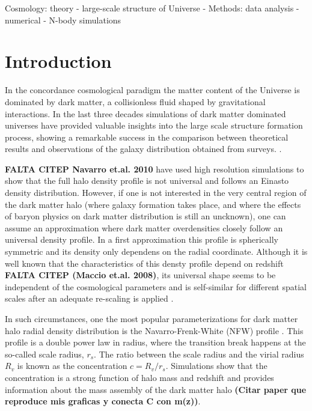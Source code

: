 \documentclass[a4,useAMS,usenatbib,usegraphicx]{mn2e}
\begin{document}
\begin{keywords}
Cosmology: theory - large-scale structure of Universe -
Methods: data analysis - numerical - N-body simulations
\end{keywords}


\section{Introduction}
\label{sec:introduction}
In the concordance cosmological paradigm the matter content of the
Universe is dominated by dark matter, a collisionless fluid shaped by
gravitational interactions.  In the last three decades simulations of
dark matter dominated universes have provided valuable insights into
the large scale structure formation process, showing a remarkable
success in the comparison between theoretical results and observations
of the galaxy distribution obtained from surveys.
\citep{Springel2005,2011ApJ...740..102K}.

{\bf FALTA CITEP Navarro et.al. 2010} have used high resolution simulations to show
that the full halo density profile is not universal and follows an
Einasto density distribution. 
However, if one is not interested in the very central region of the
dark matter halo (where galaxy formation takes place, and where the
effects of baryon physics on dark matter distribution is still an
uncknown), one can assume an approximation where dark matter
overdensities closely follow an universal density profile. 
In a first approximation this profile is spherically symmetric and
its density only dependens on the radial coordinate. 
Although it is well known that the characteristics of
this densty profile depend on redshift {\bf FALTA CITEP (Maccio
  et.al. 2008)}, its universal shape seems to be independent of the
cosmological parameters and is self-similar for different spatial
scales after an adequate re-scaling is applied \citep{NFW,Taylor2001}.

In such circumstances, one the most popular parameterizations
for dark matter halo radial density distribution is the
Navarro-Frenk-White (NFW) profile \citep{NFW}.  
This profile is a double power law in radius, where the transition
break happens at the so-called scale radius, $r_s$.  
The ratio between the scale radius and the virial radius $R_v$ is
known as the concentration $c=R_v/r_s$. 
Simulations show that the concentration is a strong function of halo
mass and redshift and provides information about the mass assembly of
the dark matter halo {\bf (Citar paper que reproduce mis graficas y conecta
C con m(z))}.
\end{document}
